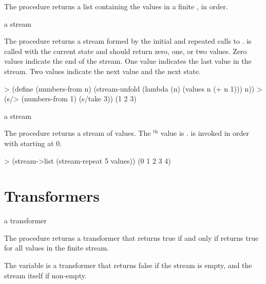 The  procedure returns a list containing the values in a finite
, in order.

\begin{procedure}
\end{procedure}
\returns{} a stream

The  procedure returns a stream formed by the initial  and
repeated calls to .  is called with the current state and
should return zero, one, or two values. Zero values indicate the end of the stream. One
value indicates the last value in the stream. Two values indicate the next value and the
next state.

\codebegin
> (define (numbers-from n)
    (stream-unfold (lambda (n) (values n (+ n 1))) n))
> (s/> (numbers-from 1) (s/take 3))
(1 2 3)
\codeend

\begin{procedure}
\end{procedure}
\returns{} a stream

The  procedure returns a stream of  values. The
$^\textrm{th}$ value is .  is invoked in
order with  starting at 0.

\codebegin
> (stream->list (stream-repeat 5 values))
(0 1 2 3 4)
\codeend

\section {Transformers}

\begin{procedure}
\end{procedure}
\returns{} a transformer

The  procedure returns a transformer that returns true if and only if
 returns true for all values in the finite stream.

\begin{variable}
\end{variable}
\antipar

The  variable is a transformer that returns false if the stream is empty, and
the stream itself if non-empty.

